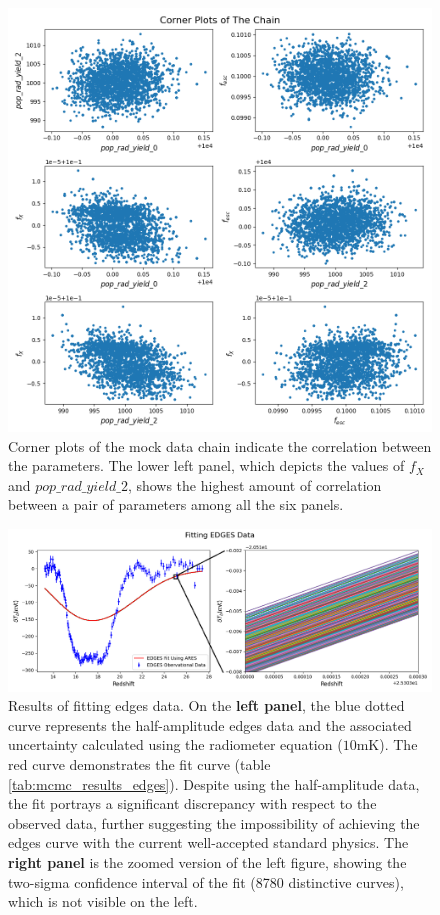 \documentclass[12pt, TexShade, letterpaper]{report}
\begin{document}
\begin{figure}[h!]
\centering
\includegraphics[scale =0.6]{corner_plots_known_curve.png}
\caption[Corner plots of the mock data chain]{Corner plots of the mock data chain indicate the correlation between the parameters. The lower left panel, which depicts the values of $f_X$ and $pop\_rad\_yield\_2$, shows the highest amount of correlation between a pair of parameters among all the six panels.}
\label{fig:corner_plots_known_curve}
\end{figure}
\begin{figure}[h!]
\centering
\includegraphics[scale =0.7]{fit_curve_edges.png}
\caption[Results of fitting \gls{edges} data]{Results of fitting \gls{edges} data. On the \textbf{left panel}, the blue dotted curve represents the half-amplitude \gls{edges} data and the associated uncertainty calculated using the radiometer equation ($\mathrm{10mK}$). The red curve demonstrates the fit curve (table \ref{tab:mcmc_results_edges}). Despite using the half-amplitude data, the fit portrays a significant discrepancy with respect to the observed data, further suggesting the impossibility of achieving the \gls{edges} curve with the current well-accepted standard physics. The \textbf{right panel} is the zoomed version of the left figure, showing the two-sigma confidence interval of the fit (8780 distinctive curves), which is not visible on the left.}
\label{fig:fit_curve_edges}
\end{figure}
\end{document}
